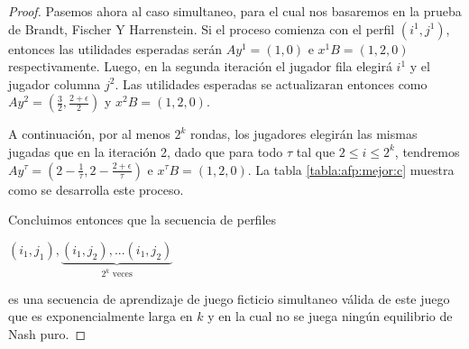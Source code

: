 \begin{proof}
    Pasemos ahora al caso simultaneo, para el cual nos basaremos en la prueba de Brandt, Fischer Y Harrenstein. Si el proceso comienza con el perfil $(i^1, j^1)$, entonces las utilidades esperadas serán $Ay^1 = (1, 0)$ e $x^1 B = (1, 2, 0)$ respectivamente. Luego, en la segunda iteración el jugador fila elegirá $i^1$ y el jugador columna $j^2$. Las utilidades esperadas se actualizaran entonces como $Ay^2 = (\frac{3}{2}, \frac{2 + \epsilon}{2})$ y $x^2 B = (1, 2, 0)$.

    A continuación, por al menos $2^k$ rondas, los jugadores elegirán las mismas jugadas que en la iteración 2, dado que para todo $\tau$ tal que $2 \le i \le 2^k$, tendremos $Ay^\tau = (2 - \frac{1}{\tau}, 2 - \frac{2 + \epsilon}{\tau})$ e $x^\tau B = (1, 2, 0)$. La tabla \ref{tabla:afp:mejor:c} muestra como se desarrolla este proceso.

    Concluimos entonces que la secuencia de perfiles

    \begin{center}
    \begin{math}
        (i_1, j_1), \underbrace{(i_1, j_2), ... (i_1, j_2)}_{\text{$2^k$ veces}}
    \end{math}
    \end{center}


    es una secuencia de aprendizaje de juego ficticio simultaneo válida de este juego que es exponencialmente larga en $k$ y en la cual no se juega ningún equilibrio de Nash puro.

\end{proof}